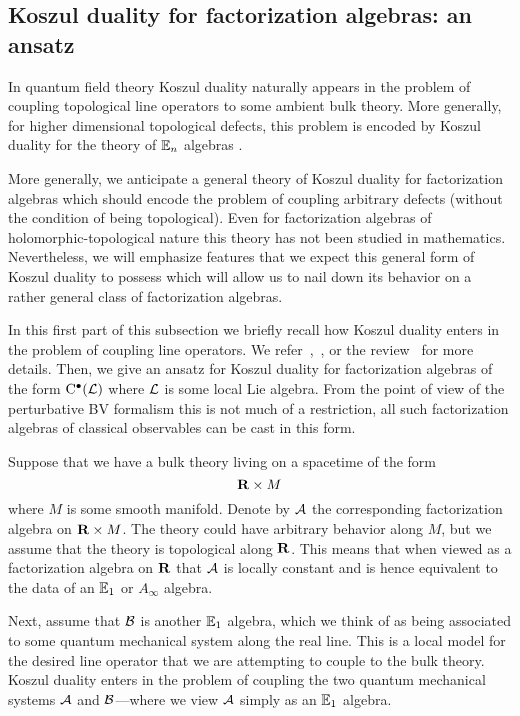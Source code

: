 \subsection{Koszul duality for factorization algebras: an ansatz} 

In quantum field theory Koszul duality naturally appears in the problem of coupling topological line operators to some ambient bulk theory. 
More generally, for higher dimensional topological defects, this problem is encoded by Koszul duality for the theory of $\mathbb E_n$ algebras \cite{FrancisGaitsgory} \cite[\S 5.2]{LurieHA}.

More generally, we anticipate a general theory of Koszul duality for factorization algebras which should encode the problem of coupling arbitrary defects (without the condition of being topological).
Even for factorization algebras of holomorphic-topological nature this theory has not been studied in mathematics. 
Nevertheless, we will emphasize features that we expect this general form of Koszul duality to possess which will allow us to nail down its behavior on a rather general class of factorization algebras. 

In this first part of this subsection we briefly recall how Koszul duality enters in the problem of coupling line operators. 
We refer~\cite[\S 6]{CP1},~\cite[\S 8]{CG1}, or the review~\cite{PWkoszul} for more details. 
Then, we give an ansatz for Koszul duality for factorization algebras of the form ${\rm C}^\bullet(\mathcal L)$ where $\mathcal L$ is some local Lie algebra. 
From the point of view of the perturbative BV formalism this is not much of a restriction, all such factorization algebras of classical observables can be cast in this form. 

\parsec[s:lines]
Suppose that we have a bulk theory living on a spacetime of the form 
\[
\mathbf{R} \times M 
\]
where $M$ is some smooth manifold. 
Denote by $\mathcal A$ the corresponding factorization algebra on $\mathbf{R} \times M$. 
The theory could have arbitrary behavior along $M$, but we assume that the theory is topological along $\mathbf{R}$. 
This means that when viewed as a factorization algebra on $\mathbf{R}$ that $\mathcal A$ is locally constant and is hence equivalent to the data of an $\mathbb E_1$ or $A_\infty$ algebra.

Next, assume that $\mathcal B$ is another $\mathbb E_1$ algebra, which we think of as being associated to some quantum mechanical system along the real line.
This is a local model for the desired line operator that we are attempting to couple to the bulk theory.
Koszul duality enters in the problem of coupling the two quantum mechanical systems $\mathcal A$ and $\mathcal B$---where we view $\mathcal A$ simply as an $\mathbb E_1$ algebra. 

